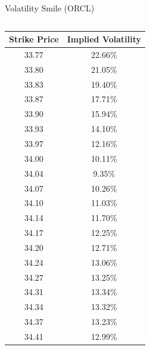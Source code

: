 \documentclass{beamer}
\begin{document}
\begin{frame}[shrink=50]{{\color{cyan}Volatility Smile ({\color{magenta}ORCL})}}
\bigskip
\begin{columns}

\begin{column}{0.3\textwidth}
\begin{table}[H]
\begin{center}
\begin{tabular}{cc}
\hline
\textbf{Strike Price}	& \textbf{Implied Volatility}\\
\hline \hline
33.77	& 22.66\%\\
33.80	& 21.05\%\\
33.83	& 19.40\%\\
33.87	& 17.71\%\\
33.90	& 15.94\%\\
33.93	& 14.10\%\\
33.97	& 12.16\%\\
34.00	& 10.11\%\\
{\color{orange}34.04}	& 9.35\%\\
34.07	& 10.26\%\\
34.10	& 11.03\%\\
34.14	& 11.70\%\\
34.17	& 12.25\%\\
34.20	& 12.71\%\\
34.24	& 13.06\%\\
34.27	& 13.25\%\\
34.31	& 13.34\%\\
34.34	& 13.32\%\\
34.37	& 13.23\%\\
34.41	& 12.99\%\\
\hline
\end{tabular}
\label{tab:ORCL_volatility_smile}
\end{center}
\end{table}
\end{column}


\end{columns}
\end{frame}
\end{document}
